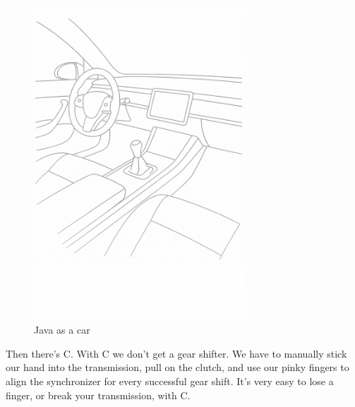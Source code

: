 \documentclass[12pt]{article}
\begin{document}
\begin{figure}[htbp]
    \centering
    \includegraphics[width=0.7\textwidth]{java.png}
    \caption{Java as a car}
    \label{fig:java}
\end{figure}

Then there's C. With C we don't get a gear shifter. We have to manually stick our hand into the transmission, pull on the clutch, and use our pinky fingers to align the synchronizer for every successful gear shift. It's very easy to lose a finger, or break your transmission, with C.
\end{document}
